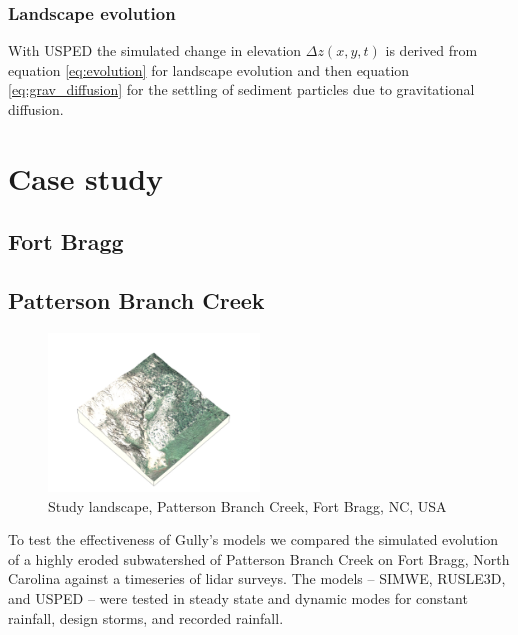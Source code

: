 \documentclass[final,3p,times,twocolumn]{elsarticle}
\begin{document}
\subsubsection{Landscape evolution}
With USPED the simulated change in elevation $\Delta z(x,y,t)$
is derived from equation \ref{eq:evolution} for landscape evolution
and then equation \ref{eq:grav_diffusion}
for the settling of sediment particles due to gravitational diffusion.

\clearpage

\section{Case study} 

\subsection{Fort Bragg}





\subsection{Patterson Branch Creek}

\begin{figure}[h]
\includegraphics[width=0.5\textwidth]{../images/sample_data_3d/naip_2014.png}
\caption{Study landscape, Patterson Branch Creek, Fort Bragg, NC, USA}
\label{fig:3d}
\end{figure}

To test the effectiveness of Gully's models 
we compared the simulated evolution
of a highly eroded subwatershed of 
Patterson Branch Creek on Fort Bragg, North Carolina
against a timeseries of lidar surveys.
%
The models -- SIMWE, RUSLE3D, and USPED --
were tested in steady state and dynamic modes
for constant rainfall, design storms, and recorded rainfall.
\end{document}
